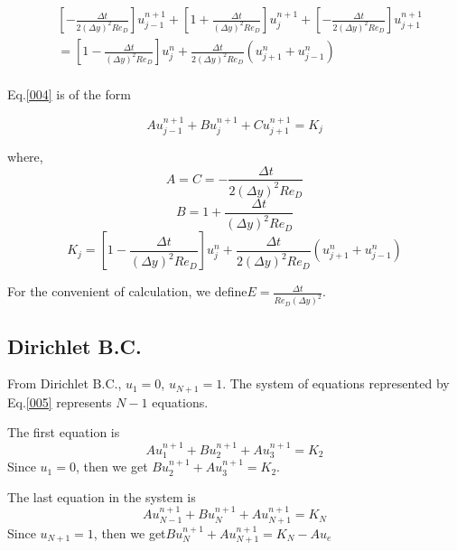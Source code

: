 \begin{equation}
\begin{split}
&[-\frac{\Delta t}{2(\Delta y)^2 Re_D}]u^{n+1}_{j-1} + [1+\frac{\Delta t}{(\Delta y)^2 Re_D}]u^{n+1}_j + [-\frac{\Delta t}{2(\Delta y)^2 Re_D}]u^{n+1}_{j+1}\\
& =[1-\frac{\Delta t}{(\Delta y)^2 Re_D}]u^n_j + \frac{\Delta t}{2(\Delta y)^2 Re_D}(u^n_{j+1}+u^n_{j-1})\\ \label{004}
\end{split}
\end{equation}

Eq.\eqref{004} is of the form

\begin{equation}
Au^{n+1}_{j-1} + Bu^{n+1}_j + Cu^{n+1}_{j+1} = K_j \label{005}
\end{equation}

where,
\begin{equation}
A = C = -\frac{\Delta t}{2(\Delta y)^2 Re_D} \label{111}
\end{equation}
\begin{equation}
B = 1+\frac{\Delta t}{(\Delta y)^2 Re_D} \label{112}
\end{equation}
\begin{equation}
K_j = [1-\frac{\Delta t}{(\Delta y)^2 Re_D}]u^n_j + \frac{\Delta t}{2(\Delta y)^2 Re_D}(u^n_{j+1}+u^n_{j-1}) \label{113}
\end{equation}

For the convenient of calculation, we define$E = \frac{\Delta t}{Re_D (\Delta y)^2}$.

\subsection{Dirichlet B.C.}
From Dirichlet B.C., $u_1 = 0$, $u_{N+1}  = 1$. The system of equations represented by Eq.\eqref{005} represents $N-1$ equations.

The first equation is
\begin{equation}
Au^{n+1}_1 + Bu^{n+1}_2 + Au^{n+1}_3 = K_2
\end{equation}
Since $u_1 = 0$, then we get $ Bu^{n+1}_2 + Au^{n+1}_3 = K_2$.

The last equation in the system is
\begin{equation}
Au^{n+1}_{N-1} + Bu^{n+1}_N + Au^{n+1}_{N+1} = K_N
\end{equation}
Since $u_{N+1}=1$, then we get$Bu^{n+1}_N + Au^{n+1}_{N+1} = K_N - Au_e$


